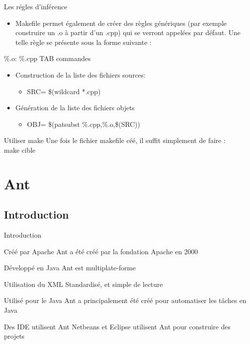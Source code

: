 \documentclass{beamer}
\begin{document}
\begin{frame}
    Les r\'egles d'inf\'erence
    \begin{itemize}
        \item{Makefile permet \'egalement de cr\'eer des r\`egles g\'en\'eriques (par exemple construire un .o à partir d'un .cpp) qui se verront appel\'ees par d\'efaut.
        Une telle r\`egle se pr\'esente sous la forme suivante :}
    \end{itemize}
    \%.o: \%.cpp
    \newline TAB commandes
    \newline
    \begin{itemize}
        \item Construction de la liste des fichiers sources:
            \begin{itemize}
               \item SRC= \$(wildcard *.cpp)
    	   \end{itemize}
        \item G\'en\'eration de la liste des fichiers objets
            \begin{itemize}
               \item  OBJ= \$(patsubst \%.cpp,\%.o,\$(SRC))
    	   \end{itemize}
    \end{itemize}
\end{frame}

\begin{frame}{Utiliser make}
    Une fois le fichier makefile c\'e\'e, il suffit simplement de faire :\\
    make cible 
\end{frame}

\section{Ant}

\subsection{Introduction}

\begin{frame}{Introduction}
    \begin{block}{Cr\'e\'e par Apache}
        Ant a \'et\'e cr\'e\'e par la fondation Apache en 2000
    \end{block}
    \begin{block}{D\'evelopp\'e en Java}
        Ant est multiplate-forme
    \end{block}
    \begin{block}{Utilisation du XML}
        Standardis\'e, et simple de lecture
    \end{block}
    \begin{block}{Utilis\'e pour le Java}
        Ant a principalement \'et\'e cr\'e\'e pour automatiser les t\^aches en Java
    \end{block}
    \begin{block}{Des IDE utilisent Ant}
        Netbeans et Eclipse utilisent Ant pour construire des projets
    \end{block}
\end{frame}
\end{document}
